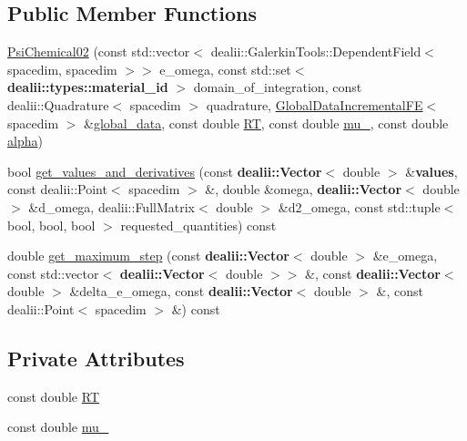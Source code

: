 \subsection*{Public Member Functions}
\begin{DoxyCompactItemize}
\item 
\hyperlink{classincremental_f_e_1_1_psi_chemical02_a0401571a4ff464e6ae4191a0d013bb81}{Psi\+Chemical02} (const std\+::vector$<$ dealii\+::\+Galerkin\+Tools\+::\+Dependent\+Field$<$ spacedim, spacedim $>$$>$ e\+\_\+omega, const std\+::set$<$ {\bf dealii\+::types\+::material\+\_\+id} $>$ domain\+\_\+of\+\_\+integration, const dealii\+::\+Quadrature$<$ spacedim $>$ quadrature, \hyperlink{classincremental_f_e_1_1_global_data_incremental_f_e}{Global\+Data\+Incremental\+FE}$<$ spacedim $>$ \&\hyperlink{classincremental_f_e_1_1_psi_3_01spacedim_00_01spacedim_01_4_abf0a4804877fd7cc9bd1b90e52760ba9}{global\+\_\+data}, const double \hyperlink{classincremental_f_e_1_1_psi_chemical02_a4b93e968af97d8497a53be13980ef22e}{RT}, const double \hyperlink{classincremental_f_e_1_1_psi_chemical02_a70426dc3fa6acda53984c2e178ad92c5}{mu\+\_}, const double \hyperlink{classincremental_f_e_1_1_psi_3_01spacedim_00_01spacedim_01_4_af7b8227188dbdd6ada35b9445d96c79d}{alpha})
\item 
bool \hyperlink{classincremental_f_e_1_1_psi_chemical02_ab45494dcca7ee5787ae1ea11fab44d18}{get\+\_\+values\+\_\+and\+\_\+derivatives} (const {\bf dealii\+::\+Vector}$<$ double $>$ \&{\bf values}, const dealii\+::\+Point$<$ spacedim $>$ \&, double \&omega, {\bf dealii\+::\+Vector}$<$ double $>$ \&d\+\_\+omega, dealii\+::\+Full\+Matrix$<$ double $>$ \&d2\+\_\+omega, const std\+::tuple$<$ bool, bool, bool $>$ requested\+\_\+quantities) const 
\item 
double \hyperlink{classincremental_f_e_1_1_psi_chemical02_a5738025aba5fcadb4d3ffcb0cea103dd}{get\+\_\+maximum\+\_\+step} (const {\bf dealii\+::\+Vector}$<$ double $>$ \&e\+\_\+omega, const std\+::vector$<$ {\bf dealii\+::\+Vector}$<$ double $>$$>$ \&, const {\bf dealii\+::\+Vector}$<$ double $>$ \&delta\+\_\+e\+\_\+omega, const {\bf dealii\+::\+Vector}$<$ double $>$ \&, const dealii\+::\+Point$<$ spacedim $>$ \&) const 
\end{DoxyCompactItemize}
\subsection*{Private Attributes}
\begin{DoxyCompactItemize}
\item 
const double \hyperlink{classincremental_f_e_1_1_psi_chemical02_a4b93e968af97d8497a53be13980ef22e}{RT}
\item 
const double \hyperlink{classincremental_f_e_1_1_psi_chemical02_a70426dc3fa6acda53984c2e178ad92c5}{mu\+\_}
\end{DoxyCompactItemize}


